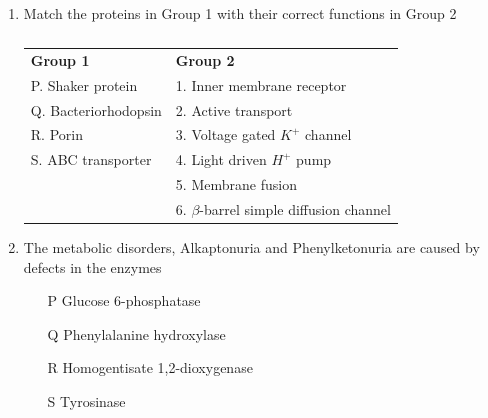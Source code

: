 \documentclass[journal,12pt,onecolumn]{IEEEtran}
\theoremstyle{remark}
\begin{document}
\begin{enumerate}
\item Match the proteins in Group 1 with their correct functions in Group 2 
\hfill{}

\begin{table}[h]
\centering
\begin{tabular}{ll}
\textbf{Group 1} & \textbf{Group 2} \\
P. Shaker protein & 1. Inner membrane receptor \\
Q. Bacteriorhodopsin & 2. Active transport \\
R. Porin & 3. Voltage gated $K^+$ channel \\
S. ABC transporter & 4. Light driven $H^+$ pump \\
 & 5. Membrane fusion \\
 & 6. $\beta$-barrel simple diffusion channel \\
\end{tabular}
\caption*{}
\label{tab:q18}
\end{table}

\begin{enumerate}
\end{enumerate}

\item The metabolic disorders, Alkaptonuria and Phenylketonuria are caused by defects in the enzymes 
\hfill{}
\begin{enumerate}
    \item[P] Glucose 6-phosphatase
    \item[Q] Phenylalanine hydroxylase
    \item[R] Homogentisate 1,2-dioxygenase
    \item[S] Tyrosinase
\end{enumerate}

\begin{enumerate}
\end{enumerate}


\end{enumerate}
\end{document}
